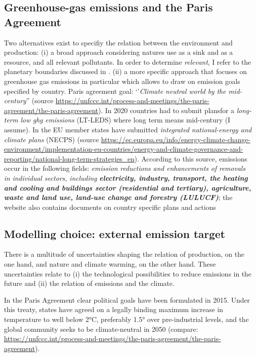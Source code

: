 \subsection{Greenhouse-gas emissions and the Paris Agreement}

Two alternatives exist to specifiy the relation between the environment and production: (i) a broad approach considering natures use as a sink and as a resource, and all relevant pollutants. 
In order to determine \textit{relevant}, I refer to the planetary boundaries discussed in \cite{Rockstrom2009AHumanity}. (ii) a more specific approach that focuses on greenhouse gas emissions in particular which allows to draw on emission goals specified by country. Paris agreement goal: `'\textit{Climate neutral world by the mid-century}'' (source \url{https://unfccc.int/process-and-meetings/the-paris-agreement/the-paris-agreement}). In 2020 countries had to submit plansfor a \textit{long-term low ghg emissions} (LT-LEDS) where long term means mid-century (I assume). In the EU member states have submitted \textit{integrated national-energy and climate plans} (NECPS) (source \url{https://ec.europa.eu/info/energy-climate-change-environment/implementation-eu-countries/energy-and-climate-governance-and-reporting/national-long-term-strategies_en}). According to this source, emissions occur in the following fields: 
\textit{emission reductions and enhancements of removals in individual sectors, including \textbf{electricity, industry, transport, the heating and cooling and buildings sector (residential and tertiary), agriculture, waste and land use, land-use change and forestry (LULUCF)}}; the website also contains documents on country specific plans and actions

\subsection{Modelling choice: external emission target}\label{app:emission_climate_targets}
There is a multitude of uncertainties shaping the relation of production, on the one hand, and nature and climate warming, on the other hand. These uncertainties relate to (i) the technological possibilities to reduce emissions in the future and (ii) the relation of emissions and the climate. 

In the Paris Agreement clear political goals have been formulated in 2015. Under this treaty, states have agreed on a legally binding maximum increase in temperature to well below 2°C, preferably 1.5° over pre-industrial levels, and the global community seeks to be climate-neutral in 2050  (compare:\\ \url{https://unfccc.int/process-and-meetings/the-paris-agreement/the-paris-agreement}). 

